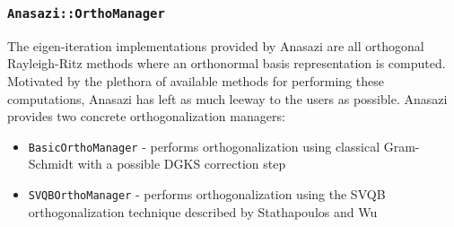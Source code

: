 \documentclass[acmtoms,acmnow]{acmtrans2m}
\newcommand{\aspace}[1]{\texttt{#1}}
\begin{document}
\subsubsection{\aspace{Anasazi::OrthoManager}}

The eigen-iteration implementations provided by Anasazi are all orthogonal 
Rayleigh-Ritz methods where an orthonormal basis representation is computed. 
Motivated by the plethora of available methods for performing these 
computations, Anasazi has left as much leeway to the users as possible. 
Anasazi provides two concrete orthogonalization managers:
\begin{itemize}
\item
  \aspace{BasicOrthoManager} - performs orthogonalization using
  classical Gram-Schmidt with a possible DGKS correction step~\cite{dgks:76}
\item
  \aspace{SVQBOrthoManager} - performs orthogonalization using the
  SVQB orthogonalization technique described by Stathapoulos and
  Wu~\cite{Stathopoulos:2002:BOP}
\end{itemize}





\end{document}
